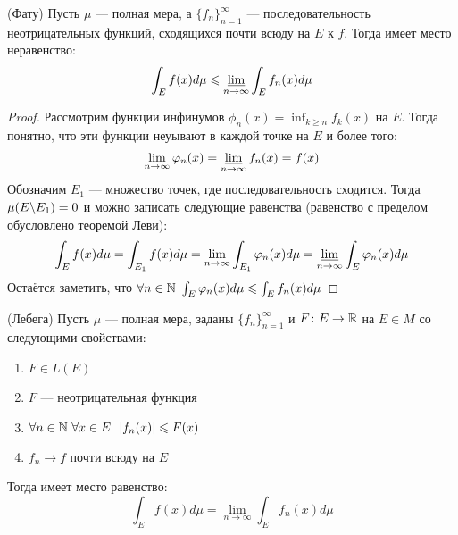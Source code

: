 \begin{theorem} (Фату)
	Пусть $\mu$ --- полная мера, а $\{f_n\}_{n = 1}^\infty$ --- последовательность неотрицательных функций, сходящихся почти всюду на $E$ к $f$. Тогда имеет место неравенство:
	\[
		\int_E f(x)d\mu \le \varliminf_{n \to \infty} \int_E f_n(x)d\mu
	\]
\end{theorem}

\begin{proof}
	Рассмотрим функции инфинумов $\phi_n(x) = \inf_{k \ge n} f_k(x)$ на $E$. Тогда понятно, что эти функции неуывают в каждой точке на $E$ и более того:
	\[
		\lim_{n \to \infty} \phi_n(x) = \varliminf_{n \to \infty} f_n(x) = f(x)
	\]
	Обозначим $E_1$ --- множество точек, где последовательность сходится. Тогда $\mu(E \bs E_1) = 0$ и можно записать следующие равенства (равенство с пределом обусловлено теоремой Леви):
	\[
		\int_E f(x)d\mu = \int_{E_1} f(x)d\mu = \lim_{n \to \infty} \int_{E_1} \phi_n(x)d\mu = \varliminf_{n \to \infty} \int_E \phi_n(x)d\mu
	\]
	Остаётся заметить, что $\forall n \in \N\ \int_E \phi_n(x)d\mu \le \int_E f_n(x)d\mu$
\end{proof}

\begin{theorem} (Лебега)
	Пусть $\mu$ --- полная мера, заданы $\{f_n\}_{n = 1}^\infty$ и $F \colon E \to \R$ на $E \in M$ со следующими свойствами:
	\begin{enumerate}
		\item $F \in L(E)$
		
		\item $F$ --- неотрицательная функция
		
		\item $\forall n \in \N\ \forall x \in E\ \ |f_n(x)| \le F(x)$
		
		\item $f_n \to f$ почти всюду на $E$
	\end{enumerate}
	Тогда имеет место равенство:
	\[
		\int_E f(x)d\mu = \lim_{n \to \infty} \int_E f_n(x)d\mu
	\]
\end{theorem}

